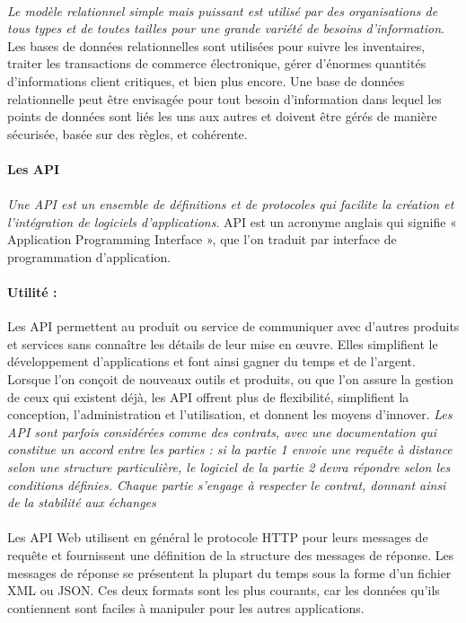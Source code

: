  \paragraph{}
 \textit{Le modèle relationnel simple mais puissant est utilisé par des organisations 
 de tous types et de toutes tailles pour une grande variété de besoins d'information}\cite{Oracle}.
  Les bases de données relationnelles sont utilisées pour suivre les inventaires, 
  traiter les transactions de commerce électronique, gérer d'énormes quantités d'informations
   client critiques, et bien plus encore. Une base de données relationnelle peut être envisagée 
   pour tout besoin d'information dans lequel les points de données sont liés les uns 
   aux autres et doivent être gérés de manière sécurisée, basée sur des règles, et cohérente.

\paragraph{Les API}
\paragraph{}
\textit{Une API est un ensemble de définitions et de protocoles qui facilite la création et 
l'intégration de logiciels d'applications}\cite{RedHat}. API est un acronyme anglais qui signifie 
« Application Programming Interface », que l'on traduit par interface de programmation d'application.
\paragraph{Utilité :}
Les API permettent au produit ou service de communiquer avec d'autres produits et services 
sans connaître les détails de leur mise en œuvre. Elles simplifient le développement d'applications 
et font ainsi gagner du temps et de l'argent. Lorsque l'on conçoit de nouveaux outils et produits, 
ou que l'on assure la gestion de ceux qui existent déjà, les API offrent plus de flexibilité, 
simplifient la conception, l'administration et l'utilisation, et donnent les moyens d'innover.
\textit{Les API sont parfois considérées comme des contrats, avec une documentation qui constitue 
un accord entre les parties : si la partie 1 envoie une requête à distance selon une structure 
particulière, le logiciel de la partie 2 devra répondre selon les conditions définies. 
Chaque partie s’engage à respecter le contrat, donnant ainsi de la stabilité aux échanges}\cite{Alteva}
\paragraph{}
Les API Web utilisent en général le protocole HTTP pour leurs messages de requête et fournissent une 
définition de la structure des messages de réponse. Les messages de réponse se présentent 
la plupart du temps sous la forme d'un fichier XML ou JSON. Ces deux formats sont les plus courants, 
car les données qu'ils contiennent sont faciles à manipuler pour les autres applications.
